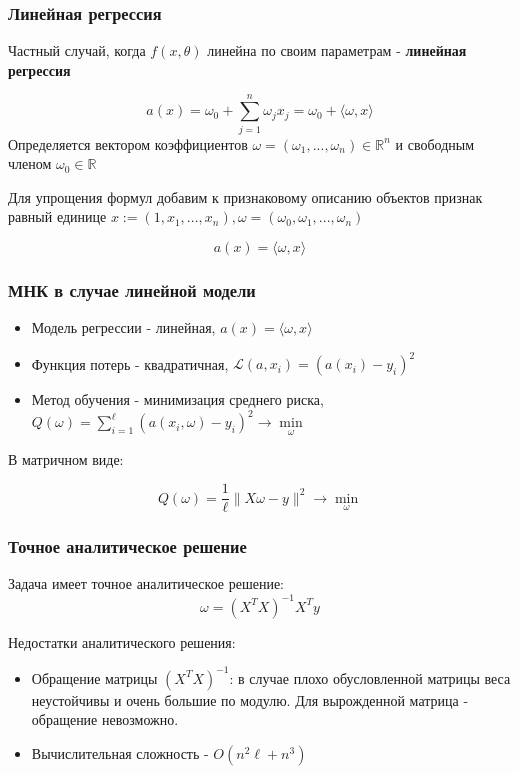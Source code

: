 \documentclass{beamer}
\begin{document}
	
	\begin{frame}
		\frametitle{Линейная регрессия}
		
		Частный случай, когда $f(x, \theta)$ линейна по своим параметрам - \textbf{линейная регрессия}
		
		$$
		a(x) = \omega_0 + \sum_{j=1}^{n} \omega_j x_j = 
		\omega_0 + \langle \omega, x\rangle 
		$$
		Определяется вектором коэффициентов $\omega = (\omega_1, ..., \omega_n) \in \mathbb{R}^{n}$ и свободным членом $\omega_0 \in \mathbb{R}$
		
		\vspace{15pt}
		
		Для упрощения формул добавим к признаковому описанию объектов признак равный единице $x := (1, x_1, ..., x_n), \omega=(\omega_0, \omega_1, ..., \omega_{n})$
		
		$$
		a(x) = \langle \omega, x \rangle
		$$
	\end{frame}	


	\begin{frame}
		\frametitle{МНК в случае линейной модели}
		
		\begin{itemize}
			\item Модель регрессии - линейная, $a(x) = \langle \omega, x \rangle$
			\item Функция потерь - квадратичная, $\mathcal{L}(a, x_i) = (a(x_i) - y_i)^{2}$
			\item Метод обучения - минимизация среднего риска, 
			$Q(\omega) = \sum_{i=1}^{\ell} (a(x_i, \omega) - y_i)^{2} \to \min\limits_{\omega}$
		\end{itemize}
	
		\vspace{15pt}
		
		В матричном виде:
		
		$$
		Q(\omega) = \frac{1}{\ell} \|X\omega - y\|^{2} \to \min_{\omega}
		$$
	\end{frame}


	\begin{frame}
		\frametitle{Точное аналитическое решение}
		Задача имеет точное аналитическое решение:
		$$
		\omega = (X^{T} X)^{-1} X^{T}y
		$$
		
		\vspace{15pt}
		
		Недостатки аналитического решения:
		\begin{itemize}
			\item Обращение матрицы $(X^{T} X)^{-1}$: в случае плохо обусловленной матрицы веса неустойчивы и очень большие по модулю. Для вырожденной матрица - обращение невозможно.
			\item Вычислительная сложность - $O(n^{2}\ell + n^{3})$
		\end{itemize}
	\end{frame}
\end{document}
